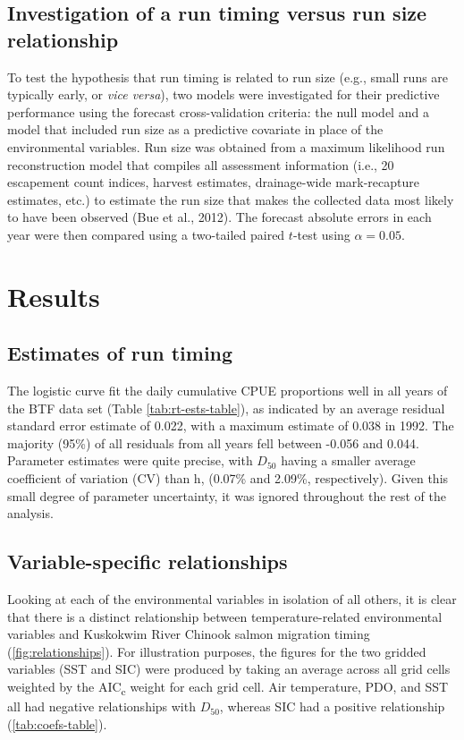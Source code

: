 \documentclass[12pt,]{book}
\theoremstyle{definition}
\theoremstyle{definition}
\theoremstyle{definition}
\theoremstyle{remark}
\begin{document}
\subsection{Investigation of a run timing versus run size
relationship}\label{investigation-of-a-run-timing-versus-run-size-relationship}

To test the hypothesis that run timing is related to run size (e.g.,
small runs are typically early, or \emph{vice versa}), two models were
investigated for their predictive performance using the forecast
cross-validation criteria: the null model and a model that included run
size as a predictive covariate in place of the environmental variables.
Run size was obtained from a maximum likelihood run reconstruction model
that compiles all assessment information (i.e., 20 escapement count
indices, harvest estimates, drainage-wide mark-recapture estimates,
etc.) to estimate the run size that makes the collected data most likely
to have been observed (Bue et al., 2012). The forecast absolute errors
in each year were then compared using a two-tailed paired \(t\)-test
using \(\alpha = 0.05\).

\section{Results}\label{results}

\subsection{Estimates of run timing}\label{estimates-of-run-timing}

The logistic curve fit the daily cumulative CPUE proportions well in all
years of the BTF data set (Table \ref{tab:rt-ests-table}), as indicated
by an average residual standard error estimate of 0.022, with a maximum
estimate of 0.038 in 1992. The majority (95\%) of all residuals from all
years fell between -0.056 and 0.044. Parameter estimates were quite
precise, with \(D_50\) having a smaller average coefficient of variation
(CV) than h, (0.07\% and 2.09\%, respectively). Given this small degree
of parameter uncertainty, it was ignored throughout the rest of the
analysis.

\subsection{Variable-specific
relationships}\label{variable-specific-relationships}

Looking at each of the environmental variables in isolation of all
others, it is clear that there is a distinct relationship between
temperature-related environmental variables and Kuskokwim River Chinook
salmon migration timing (\ref{fig:relationships}). For illustration
purposes, the figures for the two gridded variables (SST and SIC) were
produced by taking an average across all grid cells weighted by the
AIC\textsubscript{c} weight for each grid cell. Air temperature, PDO,
and SST all had negative relationships with \(D_{50}\), whereas SIC had
a positive relationship (\ref{tab:coefs-table}).
\end{document}
